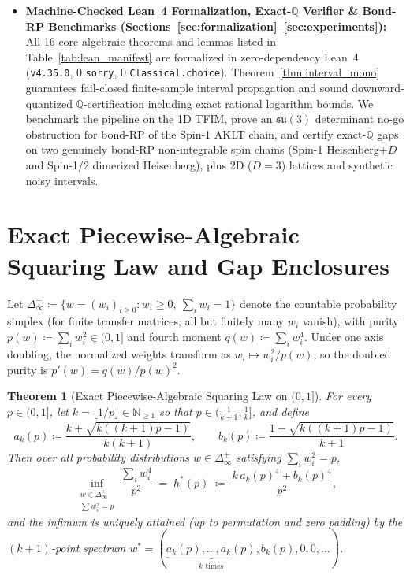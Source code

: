 \documentclass[11pt,a4paper]{article}
\newtheorem{theorem}{Theorem}[section]
\theoremstyle{definition}
\newcommand{\Q}{\mathbb{Q}}
\newcommand{\N}{\mathbb{N}}
\begin{document}
\begin{itemize}[leftmargin=1.6em,itemsep=2pt]
  \item \textbf{Machine-Checked Lean~4 Formalization, Exact-$\Q$ Verifier \& Bond-RP Benchmarks (Sections~\ref{sec:formalization}--\ref{sec:experiments}):} All 16 core algebraic theorems and lemmas listed in Table~\ref{tab:lean_manifest} are formalized in zero-dependency Lean~4 (\texttt{v4.35.0}, 0 \texttt{sorry}, 0 \texttt{Classical.choice}). Theorem~\ref{thm:interval_mono} guarantees fail-closed finite-sample interval propagation and sound downward-quantized $\Q$-certification including exact rational logarithm bounds. We benchmark the pipeline on the 1D TFIM, prove an $\mathfrak{su}(3)$ determinant no-go obstruction for bond-RP of the Spin-1 AKLT chain, and certify exact-$\Q$ gaps on two genuinely bond-RP non-integrable spin chains (Spin-1 Heisenberg+$D$ and Spin-1/2 dimerized Heisenberg), plus 2D ($D=3$) lattices and synthetic noisy intervals.
\end{itemize}

\section{Exact Piecewise-Algebraic Squaring Law and Gap Enclosures}
\label{sec:squaring}

Let $\Delta_\infty^+ \coloneqq \{w = (w_i)_{i \ge 0} : w_i \ge 0,\ \sum_i w_i = 1\}$ denote the countable probability simplex (for finite transfer matrices, all but finitely many $w_i$ vanish), with purity $p(w) \coloneqq \sum_i w_i^2 \in (0,1]$ and fourth moment $q(w) \coloneqq \sum_i w_i^4$. Under one axis doubling, the normalized weights transform as $w_i \mapsto w_i^2 / p(w)$, so the doubled purity is $p'(w) = q(w) / p(w)^2$.

\begin{theorem}[Exact Piecewise-Algebraic Squaring Law on ${(0,1]}$]
\label{thm:squaring_general}
For every $p \in (0,1]$, let $k = \lfloor 1/p \rfloor \in \N_{\ge 1}$ so that $p \in \bigl(\tfrac{1}{k+1}, \tfrac{1}{k}\bigr]$, and define
\begin{equation}
  a_k(p) \coloneqq \frac{k + \sqrt{k((k+1)p - 1)}}{k(k+1)}, \qquad
  b_k(p) \coloneqq \frac{1 - \sqrt{k((k+1)p - 1)}}{k+1}.
  \label{eq:ak_bk}
\end{equation}
Then over all probability distributions $w \in \Delta_\infty^+$ satisfying $\sum_i w_i^2 = p$,
\begin{equation}
  \inf_{\substack{w \in \Delta_\infty^+ \\ \sum w_i^2 = p}} \frac{\sum_i w_i^4}{p^2}
  \;=\; h^*(p) \;\coloneqq\; \frac{k\, a_k(p)^4 + b_k(p)^4}{p^2},
  \label{eq:hstar_general}
\end{equation}
and the infimum is uniquely attained (up to permutation and zero padding) by the $(k+1)$-point spectrum $w^* = (\underbrace{a_k(p),\dots,a_k(p)}_{k\text{ times}}, b_k(p), 0, 0, \dots)$.
\end{theorem}
\end{document}

